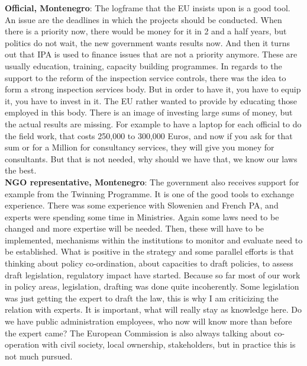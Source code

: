 \textbf{Official, Montenegro}: The logframe that the EU insists upon is a good tool. An issue are the deadlines in which the projects should be conducted. When there is a priority now, there would be money for it in 2 and a half years, but politics do not wait, the new government wants results now. And then it turns out that IPA is used to finance issues that are not a priority anymore. These are usually education, training, capacity building programmes. In regards to the support to the reform of the inspection service controls, there was the idea to form a strong inspection services body. But in order to have it, you have to equip it, you have to invest in it. The EU rather wanted to provide by educating those employed in this body. There is an image of investing large sums of money, but the actual results are missing. For example to have a laptop for each official to do the field work, that costs 250,000 to 300,000 Euros, and now if you ask for that sum or for a Million for consultancy services, they will give you money for consultants. But that is not needed, why should we have that, we know our laws the best. \\
\textbf{NGO representative, Montenegro}: The government also receives support for example from the Twinning Programme. It is one of the good tools to exchange experience. There was some experience with Slowenien and French PA, and experts were spending some time in Ministries. Again some laws need to be changed and more expertise will be needed. Then, these will have to be implemented, mechanisms within the institutions to monitor and evaluate need to be established. What is positive in the strategy and some parallel efforts is that thinking about policy co-ordination, about capacities to draft policies, to assess draft legislation, regulatory impact have started. Because so far most of our work in policy areas, legislation, drafting was done quite incoherently. Some legislation was just getting the expert to draft the law, this is why I am criticizing the relation with experts. It is important, what will really stay as knowledge here. Do we have public administration employees, who now will know more than before the expert came?  The European Commission is also always talking about co-operation with civil society, local ownership, stakeholders, but in practice this is not much pursued.%
